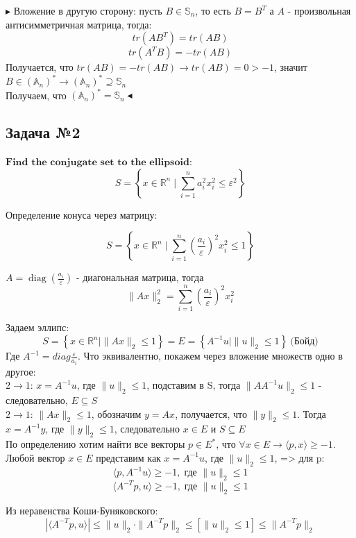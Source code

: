 \documentclass[12pt,letterpaper]{article}
\begin{document}
$\blacktriangleright$ Вложение в другую сторону: пусть $ B \in \mathbb{S}_n $, то есть $ B = B^T $ а $ A $ - произвольная антисимметричная матрица, тогда: 
$$
tr (A B^T) = tr(AB) 
$$
$$
tr(A^T B) = - tr (AB)
$$
Получается, что $ tr(AB)=-tr(AB) \rightarrow tr(AB) = 0 > -1 $, значит $ B \in \left( \mathbb{A}_n\right)^* \rightarrow \left( \mathbb{A}_n\right)^* \supseteq \mathbb{S}_n$\\
Получаем, что $\left( \mathbb{A}_n\right)^* = \mathbb{S}_n \blacktriangleleft$


\subsection*{Задача №2}
$\textbf{Find the conjugate set to the ellipsoid:}$ 
$$
S = \left\{ x \in \mathbb{R}^n \mid \sum\limits_{i = 1}^n a_i^2 x_i^2 \le \varepsilon^2 \right\}
$$

Определение конуса через матрицу: 

$$
S = \left\{ x \in \mathbb{R}^n \mid \sum\limits_{i = 1}^n \left( \frac{a_i}{\varepsilon} \right) ^2  x_i^2 \le 1 \right\}
$$

$ A = \operatorname{diag} (\frac{a_i}{\varepsilon}) $ - диагональная матрица, тогда $$ \| Ax \|_2^2 = 
 \sum\limits_{i = 1}^n \left( \frac{a_i}{\varepsilon} \right) ^2  x_i^2 $$
 
Задаем эллипс:
$$
S = \left\{ x \in \mathbb{R}^n \mid \| Ax \|_2  \le 1 \right\} =E= \left\{ A^{-1}u \mid \| u \|_2  \le 1 \right\}\ \text{(Бойд)} 
$$
Где $A^{-1}=diag\frac{\varepsilon}{a_i}$. Что эквивалентно, покажем через вложение множеств одно в другое:\\
$2\rightarrow1$: $ x = A^{-1}u $, где $ \| u \|_2  \le 1 $, подставим в S, тогда $  \|  A A^{-1}u \|_2  \le 1 $ - следовательно, $ E \subseteq S $\\
$2\rightarrow1$: $ \| Ax \|_2  \le 1 $, обозначим $ y = Ax $, получается, что $ \| y \|_2  \le 1 $. Тогда $ x = A^{-1}y $, где $ \| y \|_2  \le 1 $, следовательно $ x \in E $ и $ S \subseteq E $\\

По определению хотим найти все векторы $ p \in E^* $, что $ \forall x \in E \rightarrow \langle p, x \rangle \geq -1$. Любой вектор $ x \in E $ представим как $ x = A^{-1}u $, где $ \| u \|_2  \le 1 $, => для p:
$$
\langle p, A^{-1} u \rangle \geq -1, \; \text{где } \| u \|_2  \le 1
$$
$$
\langle A^{-T} p,  u \rangle \geq -1, \; \text{где } \| u \|_2  \le 1
$$

Из неравенства Коши-Буняковского:
$$
| \langle A^{-T} p,  u \rangle | \leq \| u \|_2 \cdot \| A^{-T} p \|_2 \leq \left[ \| u \|_2 \leq 1 \right] \leq \| A^{-T} p \|_2
$$
\end{document}
